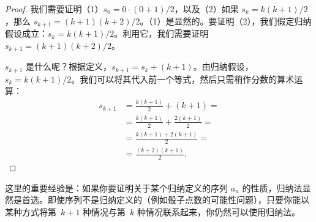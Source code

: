 \documentclass[../../../include/open-logic-section]{subfiles}
\begin{document}
\begin{proof}
  我们需要证明（1）$s_0 = 0\cdot(0 + 1)/2$，以及（2）如果 $s_k =
  k(k+1)/2$，那么 $s_{k+1} = (k+1)(k+2)/2$。（1）是显然的。要证明（2），我们假定归纳假设成立：$s_k = k(k+1)/2$。利用它，我们需要证明 $s_{k+1} = (k+1)(k+2)/2$。

  $s_{k+1}$ 是什么呢？根据定义，$s_{k+1} = s_k + (k+1)$。由归纳假设，$s_k = k(k+1)/2$。我们可以将其代入前一个等式，然后只需稍作分数的算术运算：
  \begin{align*}
    s_{k+1} & = \frac{k(k+1)}{2} + (k+1) = {}\\
    & = \frac{k(k+1)}{2} + \frac{2(k+1)}{2} = {}\\
    & = \frac{k(k+1) + 2(k+1)}{2} = {}\\
    & = \frac{(k+2)(k+1)}{2}.
  \end{align*}
\end{proof}

这里的重要经验是：如果你要证明关于某个归纳定义的序列 $a_n$ 的性质，归纳法显然是首选。即使序列不是归纳定义的（例如骰子点数的可能性问题），只要你能以某种方式将第~$k+1$ 种情况与第~$k$ 种情况联系起来，你仍然可以使用归纳法。
\end{document}
